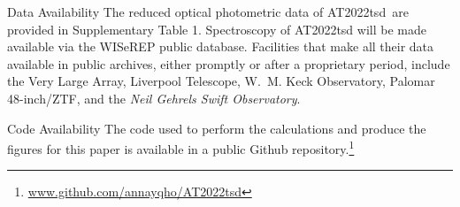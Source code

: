 \documentclass{nature_plusfigure}
\newcommand{\at}{AT2022tsd}
\begin{document}
\begin{addendum}
 \item[Data Availability] The reduced optical photometric data of \at\ are provided in Supplementary Table 1. Spectroscopy of AT2022tsd will be made available via the WISeREP public database. Facilities that make all their data available in public archives, either promptly or after a proprietary period, include the Very Large Array, Liverpool Telescope, W.~M. Keck Observatory, Palomar 48-inch/ZTF, and the {\it Neil Gehrels Swift Observatory}. 
 
 \item[Code Availability] The code used to perform the calculations and produce the figures for this paper is available in a public Github repository.\footnote{\url{www.github.com/annayqho/AT2022tsd}}

\end{addendum}


\clearpage
\newpage
\end{document}
